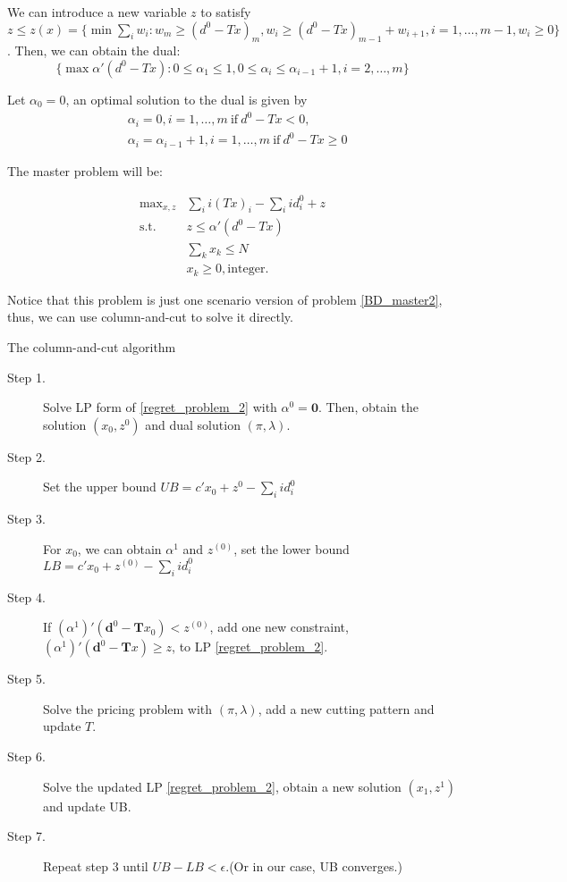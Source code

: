 We can introduce a new variable $z$ to satisfy $z \leq z(x) =\{\min \sum_{i} w_{i}: w_{m} \geq (d^{0}- Tx)_{m}, w_{i} \geq (d^{0}- Tx)_{m-1} + w_{i+1}, i =1, \ldots,m-1, w_i \geq 0 \}$. Then, we can obtain the dual:
\[\{\max \alpha{'}(d^{0}- Tx): 0 \leq \alpha_{1} \leq 1, 0 \leq \alpha_{i} \leq \alpha_{i-1} + 1, i=2,\ldots,m \}\]

Let $\alpha_0 = 0$, an optimal solution to the dual is given by
\begin{align*}
  & \alpha_{i} =0, i =1,\ldots,m \ \text{if}~  d^{0}-Tx < 0,\\ 
  & \alpha_{i} = \alpha_{i-1}+1,  i =1,\ldots,m \ \text{if}~  d^{0}-Tx \geq 0
\end{align*}

The master problem will be:

\begin{equation}\label{regret_problem_2}
  \begin{aligned}
    \mbox{max}_{x,z} & \sum_{i} i (Tx)_{i} - \sum_{i} i d^{0}_{i} + z \\
    \mbox{s.t.} \quad & z \leq \alpha{'} (d^{0}- Tx) \\
    & \sum_{k} x_{k} \leq N \\
    & x_k \geq 0, \mbox{integer}.
  \end{aligned}
\end{equation}

Notice that this problem is just one scenario version of problem \eqref{BD_master2}, thus, we can use column-and-cut to solve it directly.

\begin{algorithm}[H]\label{column_and_cut_algo1}
  \caption{The column-and-cut algorithm}
    \begin{description}
    \item[Step 1.] Solve LP form of \eqref{regret_problem_2} with $\alpha^0 = \mathbf{0}$.
    Then, obtain the solution $(x_0, z^{0})$ and dual solution $(\pi, \lambda)$.
    \item[Step 2.] Set the upper bound $UB = c{'} x_0 +  z^{0} - \sum_{i} i d^{0}_{i}$
    \item[Step 3.]
    For $x_0$, we can obtain $\alpha^{1}$ and $z^{(0)}$, set the lower bound $LB = c{'} x_0 +  z^{(0)} - \sum_{i} i d^{0}_{i}$
    \item[Step 4.]
    If $(\alpha^{1}){'}(\mathbf{d}^{0}- \mathbf{T}x_0) < z^{(0)}$, add one new constraint, $(\alpha^{1}){'}(\mathbf{d}^{0}- \mathbf{T}x) \geq z$, to LP \eqref{regret_problem_2}.
    \item[Step 5.]
    Solve the pricing problem with $(\pi,\lambda)$, add a new cutting pattern and update $T$.
    \vspace{5pt}
    \item[Step 6.] Solve the updated LP \eqref{regret_problem_2}, obtain a new solution $(x_1, z^{1})$ and update UB.
    \item[Step 7.] Repeat step 3 until $UB - LB < \epsilon$.(Or in our case, UB converges.)
   \end{description}
  \end{algorithm}

